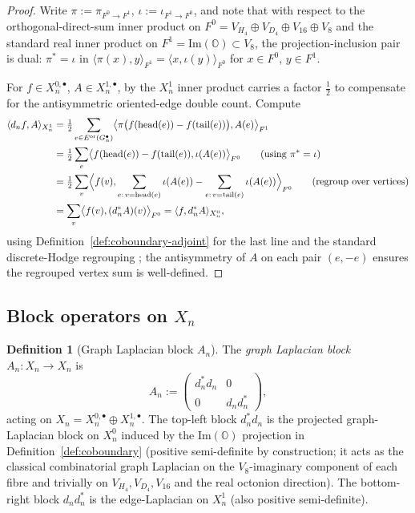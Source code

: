 \documentclass[11pt, a4paper]{amsart}
\theoremstyle{definition}
\newtheorem{definition}[theorem]{Definition}
\newcommand{\OO}{\mathbb{O}}
\renewcommand{\Im}{\mathrm{Im}}
\begin{document}
\begin{proof}
Write $\pi := \pi_{F^0 \to F^1}$, $\iota := \iota_{F^1 \to F^0}$,
and note that with respect to the orthogonal-direct-sum inner
product on $F^0 = V_{H_4} \oplus V_{D_4} \oplus V_{16} \oplus V_8$
and the standard real inner product on $F^1 = \Im(\OO) \subset
V_8$, the projection-inclusion pair is dual:
$\pi^* = \iota$ in
$\langle \pi(x), y \rangle_{F^1}
= \langle x, \iota(y) \rangle_{F^0}$
for $x \in F^0$, $y \in F^1$.

For $f \in X_n^{0, \bullet}$, $A \in X_n^{1, \bullet}$, by
\cite[Definition~\texttt{def:Xn-1}]{RefinementSpaces} the $X_n^1$
inner product carries a factor $\tfrac{1}{2}$ to compensate for
the antisymmetric oriented-edge double count. Compute
\begin{align*}
\langle d_n f, A \rangle_{X_n^1}
&= \tfrac{1}{2} \sum_{e \in E^{\rm or}(G_n^\bullet)}
   \bigl\langle \pi\bigl(f(\text{head}(e)) - f(\text{tail}(e))\bigr),
   A(e) \bigr\rangle_{F^1} \\
&= \tfrac{1}{2} \sum_{e}
   \bigl\langle f(\text{head}(e)) - f(\text{tail}(e)),
   \iota(A(e)) \bigr\rangle_{F^0}
   \qquad (\text{using } \pi^* = \iota) \\
&= \tfrac{1}{2} \sum_v \Bigl\langle f(v),
     \sum_{e:\, v=\text{head}(e)} \iota(A(e))
     - \sum_{e:\, v=\text{tail}(e)} \iota(A(e))
   \Bigr\rangle_{F^0}
   \qquad (\text{regroup over vertices}) \\
&= \sum_v \bigl\langle f(v), (d_n^* A)(v) \bigr\rangle_{F^0}
   = \langle f, d_n^* A \rangle_{X_n^0},
\end{align*}
using Definition~\ref{def:coboundary-adjoint} for the last line
and the standard discrete-Hodge regrouping
\cite[\S 1.2]{Chung}; the antisymmetry of $A$ on each pair
$(e, -e)$ ensures the regrouped vertex sum is well-defined.
\end{proof}

\subsection{Block operators on $X_n$}

\begin{definition}[Graph Laplacian block $A_n$]
\label{def:An}
The \emph{graph Laplacian block} $A_n \colon X_n \to X_n$ is
\[
  A_n := \begin{pmatrix} d_n^* d_n & 0 \\ 0 & d_n d_n^* \end{pmatrix},
\]
acting on $X_n = X_n^{0, \bullet} \oplus X_n^{1, \bullet}$. The
top-left block $d_n^* d_n$ is the projected graph-Laplacian
block on $X_n^0$ induced by the $\Im(\OO)$ projection in
Definition~\ref{def:coboundary} (positive semi-definite by
construction; it acts as the classical combinatorial graph
Laplacian on the $V_8$-imaginary component of each fibre and
trivially on $V_{H_4}, V_{D_4}, V_{16}$ and the real octonion
direction). The bottom-right block $d_n d_n^*$ is the
edge-Laplacian on $X_n^1$ (also positive semi-definite).
\end{definition}
\end{document}
